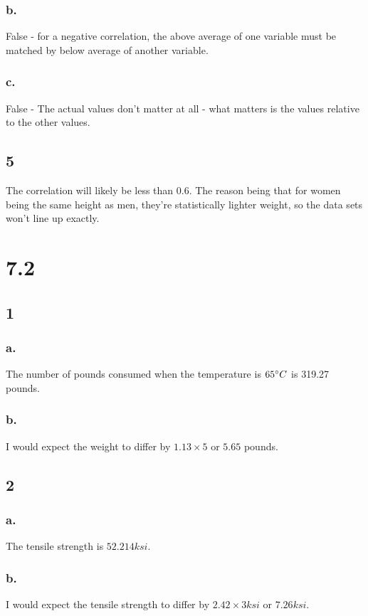 \documentclass[11pt]{article}
\begin{document}
\subsubsection{b.}
False - for a negative correlation, the above average of one variable must be
matched by below average of another variable.

\subsubsection{c.}
False - The actual values don't matter at all - what matters is the values
relative to the other values. 

\subsection{5}
The correlation will likely be less than 0.6. The reason being that for women
being the same height as men, they're statistically lighter weight, so the data
sets won't line up exactly. 
 
\section{7.2}
\subsection{1}
\subsubsection{a.}
The number of pounds consumed when the temperature is $65 \degree C$ is 319.27
pounds. 
\subsubsection{b.}
I would expect the weight to differ by $1.13\times5$ or $5.65$ pounds. 

\subsection{2}
\subsubsection{a.}
The tensile strength is $52.214 ksi$. 

\subsubsection{b.}
I would expect the tensile strength to differ by $2.42\times3 ksi$ or $7.26
ksi$. 
\end{document}
